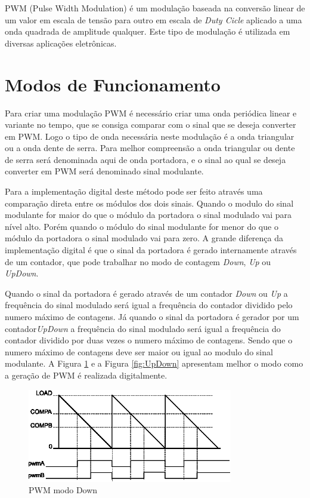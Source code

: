 
PWM (Pulse Width Modulation) é um modulação baseada na conversão linear de um valor em escala de tensão para outro em escala de \emph{Duty Cicle} aplicado a uma onda quadrada de amplitude qualquer. Este tipo de modulação é utilizada em diversas aplicações eletrônicas. 

\section{Modos de Funcionamento}

Para criar uma modulação PWM é necessário criar uma onda periódica linear e variante no tempo, que se consiga comparar com o sinal que se deseja converter em PWM. Logo o tipo de onda necessária neste modulação é a onda triangular ou a onda dente de serra. Para melhor compreensão a onda triangular ou dente de serra será denominada aqui de onda portadora, e o sinal ao qual se deseja converter em PWM será denominado sinal modulante.
  
Para a implementação digital deste método pode ser feito através uma comparação direta entre os módulos dos dois sinais. Quando o modulo do sinal modulante for maior do que o  módulo da portadora  o sinal modulado vai para nível alto. Porém quando o módulo do sinal modulante for menor do que o módulo da portadora o sinal  modulado vai para zero. A grande diferença da implementação digital é que o sinal da portadora é gerado internamente através de um contador, que pode trabalhar no modo de contagem \emph{Down}, \emph{Up} ou \emph{UpDown}.

Quando o sinal da portadora é gerado através de um contador \emph{Down} ou \emph{Up}  a frequência do sinal modulado será igual a frequência do contador dividido pelo numero máximo de contagens. Já quando o sinal da portadora é gerador por um contador\emph{UpDown} a frequência do sinal modulado será igual a frequência do contador dividido por duas vezes o numero máximo de contagens. Sendo que o numero máximo de contagens deve ser maior ou igual ao modulo do sinal modulante. A Figura \ref{fig:Down} e a Figura \ref{fig:UpDown} apresentam melhor o modo como a geração de PWM é realizada digitalmente.  

\begin{figure}[H]
	\centering
\includegraphics[width=0.8\textwidth] {figuras/Down.eps}
	\caption{PWM modo Down \cite{DATASHEET_TIVA}}
	\label{fig:Down}
\end{figure}

